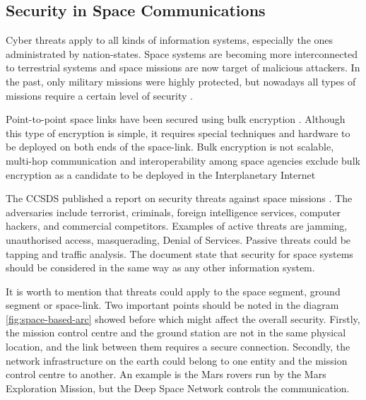 \subsection{Security in Space Communications}


Cyber threats apply to all kinds of information systems, especially the ones administrated by nation-states. Space systems are becoming more interconnected to terrestrial systems and space missions are now target of malicious attackers.  In the past, only military missions were highly protected, but nowadays all types of missions require a certain level of security \cite{book2006security}.

Point-to-point space links have been secured using bulk encryption \cite{book2011space}. Although this type of encryption is simple, it requires special techniques and hardware to be deployed on both ends of the space-link. Bulk encryption is not scalable, multi-hop communication and interoperability among space agencies exclude bulk encryption as a candidate to be deployed in the Interplanetary Internet %

The CCSDS published a report on security threats against space missions \cite{book2006security}. The adversaries include terrorist, criminals, foreign intelligence services, computer hackers, and commercial competitors.  Examples of active threats are jamming, unauthorised access, masquerading, Denial of Services. Passive threats could be tapping and traffic analysis.  The document state that security for space systems should be considered in the same way as any other information system.

It is worth to mention that threats could apply to the space segment, ground segment or space-link. Two important points should be noted in the diagram \ref{fig:space-based-arc} showed before which might affect the overall security.  Firstly, the mission control centre and the ground station are not in the same physical location, and the link between them requires a secure connection. Secondly, the network infrastructure on the earth could belong to one entity and the mission control centre to another.  An example is the Mars rovers run by the Mars Exploration Mission, but the Deep Space Network controls the communication. 


